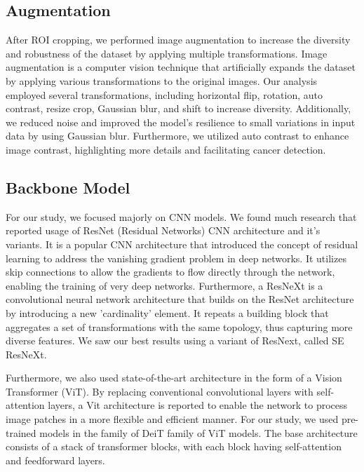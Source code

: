 \subsection{Augmentation}
After ROI cropping, we performed image augmentation to increase the diversity and robustness of the dataset by applying multiple transformations. Image augmentation is a computer vision technique that artificially expands the dataset by applying various transformations to the original images. Our analysis employed several transformations, including horizontal flip, rotation, auto contrast, resize crop, Gaussian blur, and shift to increase diversity. Additionally, we reduced noise and improved the model's resilience to small variations in input data by using Gaussian blur. Furthermore, we utilized auto contrast to enhance image contrast, highlighting more details and facilitating cancer detection.

\subsection{Backbone Model}
For our study, we focused majorly on CNN models. We found much research that reported usage of ResNet (Residual Networks) CNN architecture and it's variants. It is a popular CNN architecture that introduced the concept of residual learning to address the vanishing gradient problem in deep networks. It utilizes skip connections to allow the gradients to flow directly through the network, enabling the training of very deep networks. Furthermore, a ResNeXt is a convolutional neural network architecture that builds on the ResNet architecture by introducing a new 'cardinality' element.  It repeats a building block that aggregates a set of transformations with the same topology, thus capturing more diverse features. We saw our best results using a variant of ResNext, called SE ResNeXt. 

Furthermore, we also used state-of-the-art architecture in the form of a Vision Transformer (ViT). By replacing conventional convolutional layers with self-attention layers, a Vit architecture is reported to enable the network to process image patches in a more flexible and efficient manner. For our study, we used pre-trained models in the family of DeiT family of ViT models. The base architecture consists of a stack of transformer blocks, with each block having self-attention and feedforward layers.


